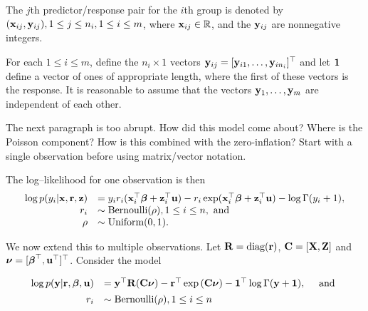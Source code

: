 \documentclass[times, doublespace]{anzsauth}
\newcommand{\joc}[1]{{\color{red}#1}}
\begin{document}
The $j$th predictor/response pair for the $i$th group is denoted by $({\bf x}_{ij}, {\bf y}_{ij}), 1 \leq j \leq n_i, 1 \leq i \leq m$, where ${\bf x}_{ij} \in {\mathbb{R}}$, and the ${\bf y}_{ij}$ are nonnegative integers.

\noindent For each $1 \leq i \leq m$, define the $n_i \times 1$ vectors ${\bf y}_{ij} = [{\bf y}_{i 1}, \ldots, {\bf y}_{i
	n_i}]^\top$ and let ${\bf 1}$ define a vector of ones of appropriate length, where the first of these vectors is
the response. It is reasonable to assume that the vectors ${\bf y}_1, \ldots, {\bf y}_m$ are independent of each
other.

\joc{The next paragraph is too abrupt. How did this model come about? Where is the Poisson component? How is this combined with the zero-inflation?
Start with a single observation before using matrix/vector notation.}

\noindent The log--likelihood for one observation is then
\begin{equation*}
	\begin{array}{rl}
		\log p(y_i | {\bf x}, {\bf r}, {\bf z}) & = y_i r_i ({\bf x}_i^\top {\boldsymbol\beta} + {\bf z}_i^\top {\bf u}) - r_i \exp ({\bf x}_i^\top {\boldsymbol\beta} + {\bf z}_i^\top {\bf u}) - \log \Gamma (y_i + 1), \\
		r_i                         & \sim \text{Bernoulli}(\rho), 1 \leq i \leq n, \text{ and }                                                                            \\
		\rho                        & \sim \mbox{Uniform}(0, 1).                                                                                              \\
	\end{array}
\end{equation*}

\noindent We now extend this to multiple observations. Let ${\bf R} = \text{diag}{({\bf r})}$, ${\bf C} = [{\bf X}, {\bf Z}]$ and ${\boldsymbol \nu} = [{\boldsymbol \beta}^\top, {\bf u}^\top]^\top$. Consider the model


\begin{equation}\label{eq:main}
	\begin{array}{rl}
		\log{p({\bf y}|{\bf r}, {\boldsymbol\beta}, {\bf u})} & = {\bf y}^\top {\bf R} ({\bf C}{\boldsymbol \nu}) - {\bf r}^\top \exp{({\bf C}{\boldsymbol\nu})} - {\bf 1}^\top \log{\Gamma{({\bf y}+ {\bf1})}}, \quad \mbox{ and } \\ [1ex]
		r_i                           & \sim \text{Bernoulli}(\rho), 1 \leq i \leq n                                                                     \\
	\end{array}
\end{equation}
\end{document}
